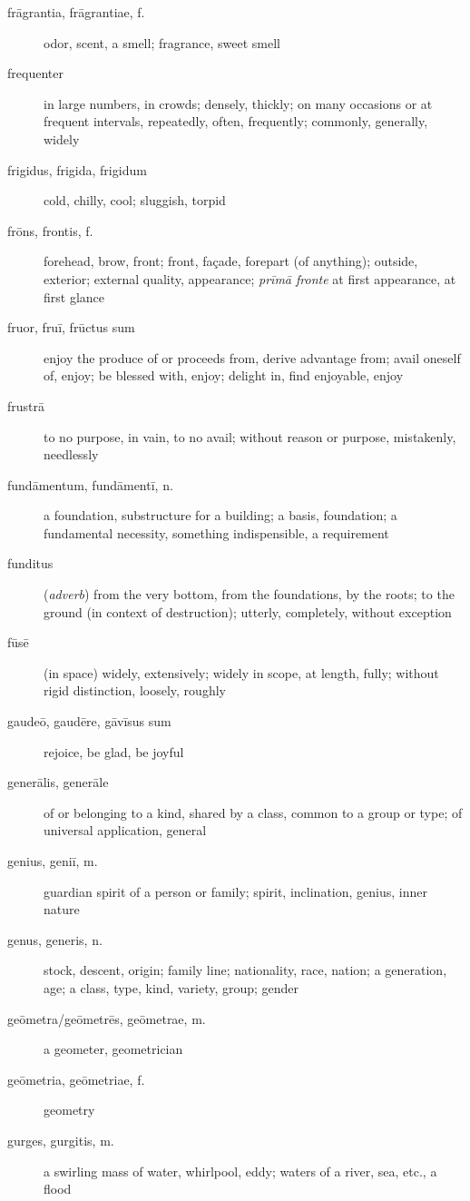 \begin{description}
    \item[frāgrantia, frāgrantiae, f.] odor, scent, a smell; fragrance, sweet smell
    \item[frequenter] in large numbers, in crowds; densely, thickly; on many occasions or at frequent intervals, repeatedly, often, frequently; commonly, generally, widely
    \item[frigidus, frigida, frigidum] cold, chilly, cool; sluggish, torpid
    \item[frōns, frontis, f.] forehead, brow, front; front, façade, forepart (of anything); outside, exterior; external quality, appearance; \textit{prīmā fronte} at first appearance, at first glance
    \item[fruor, fruī, frūctus sum] \marginnote{*}enjoy the produce of or proceeds from, derive advantage from; avail oneself of, enjoy; be blessed with, enjoy; delight in, find enjoyable, enjoy
    \item[frustrā] \marginnote{*}to no purpose, in vain, to no avail; without reason or purpose, mistakenly, needlessly
    \item[fundāmentum, fundāmentī, n.] a foundation, substructure for a building; a basis, foundation; a fundamental necessity, something indispensible, a requirement
    \item[funditus] (\textit{adverb}) from the very bottom, from the foundations, by the roots; to the ground (in context of destruction); utterly, completely, without exception
    \item[fūsē] (in space) widely, extensively; widely in scope, at length, fully; without rigid distinction, loosely, roughly
    \item[gaudeō, gaudēre, gāvīsus sum] \marginnote{*}rejoice, be glad, be joyful
    \item[generālis, generāle] of or belonging to a kind, shared by a class, common to a group or type; of universal application, general
    \item[genius, geniī, m.] guardian spirit of a person or family; spirit, inclination, genius, inner nature
    \item[genus, generis, n.] \marginnote{*}stock, descent, origin; family line; nationality, race, nation; a generation, age; a class, type, kind, variety, group; gender
    \item[geōmetra/geōmetrēs, geōmetrae, m.] a geometer, geometrician
    \item[geōmetria, geōmetriae, f.] geometry
    \item[gurges, gurgitis, m.] a swirling mass of water, whirlpool, eddy; waters of a river, sea, etc., a flood

\end{description}
